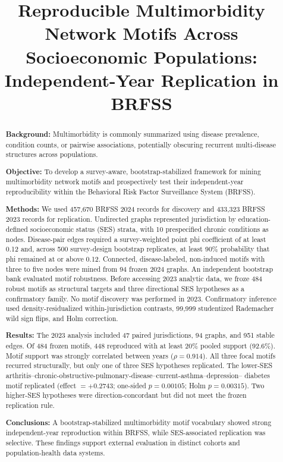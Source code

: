 \documentclass[11pt]{article}
\title{Reproducible Multimorbidity Network Motifs Across Socioeconomic
Populations: Independent-Year Replication in BRFSS}
\author{}
\date{}
\newcommand{\brfss}{\textsc{BRFSS}}
\begin{document}
\maketitle

\begin{abstract}
\textbf{Background:}
Multimorbidity is commonly summarized using disease prevalence, condition
counts, or pairwise associations, potentially obscuring recurrent
multi-disease structures across populations.

\textbf{Objective:}
To develop a survey-aware, bootstrap-stabilized framework for mining
multimorbidity network motifs and prospectively test their independent-year
reproducibility within the Behavioral Risk Factor Surveillance System
(\brfss).

\textbf{Methods:}
We used 457,670 \brfss{} 2024 records for discovery and 433,323 \brfss{} 2023
records for replication. Undirected graphs represented jurisdiction by
education-defined socioeconomic status (SES) strata, with 10 prespecified
chronic conditions as nodes. Disease-pair edges required a survey-weighted
point phi coefficient of at least 0.12 and, across 500 survey-design bootstrap
replicates, at least 90\% probability that phi remained at or above 0.12.
Connected, disease-labeled, non-induced motifs with three to five nodes were
mined from 94 frozen 2024 graphs. An independent bootstrap bank evaluated
motif robustness. Before accessing 2023 analytic data, we froze 484 robust
motifs as structural targets and three directional SES hypotheses as a
confirmatory family. No motif discovery was performed in 2023. Confirmatory
inference used density-residualized within-jurisdiction contrasts, 99,999
studentized Rademacher wild sign flips, and Holm correction.

\textbf{Results:}
The 2023 analysis included 47 paired jurisdictions, 94 graphs, and 951 stable
edges. Of 484 frozen motifs, 448 reproduced with at least 20\% pooled support
(92.6\%). Motif support was strongly correlated between years
($\rho=0.914$). All three focal motifs recurred structurally, but only one of
three SES hypotheses replicated. The lower-SES
arthritis--chronic-obstructive-pulmonary-disease--current-asthma--depression--
diabetes motif replicated (effect $=+0.2743$; one-sided $p=0.00105$; Holm
$p=0.00315$). Two higher-SES hypotheses were direction-concordant but did not
meet the frozen replication rule.

\textbf{Conclusions:}
A bootstrap-stabilized multimorbidity motif vocabulary showed strong
independent-year reproduction within \brfss, while SES-associated replication
was selective. These findings support external evaluation in distinct cohorts
and population-health data systems.
\end{abstract}
\end{document}
